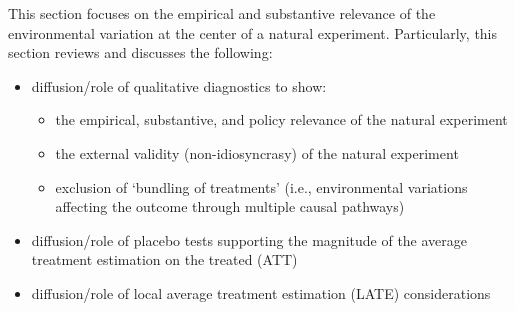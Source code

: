 This section focuses on the empirical and substantive relevance of the
environmental variation at the center of a natural experiment.  Particularly,
this section reviews and discusses the following:

\begin{itemize}
    \item diffusion/role of qualitative diagnostics to show:
        \begin{itemize}
            \item the empirical, substantive, and policy relevance of the
                natural experiment
            \item the external validity (non-idiosyncrasy) of the natural
                experiment
            \item exclusion of `bundling of treatments' (i.e., environmental
                variations affecting the outcome through multiple causal
                pathways)
        \end{itemize}
    \item diffusion/role of placebo tests supporting the magnitude of the
        average treatment estimation on the treated  (ATT)
    \item diffusion/role of local average treatment estimation (LATE) 
        considerations
\end{itemize}

%
%
%
%
%
%
%
%
%
%
%